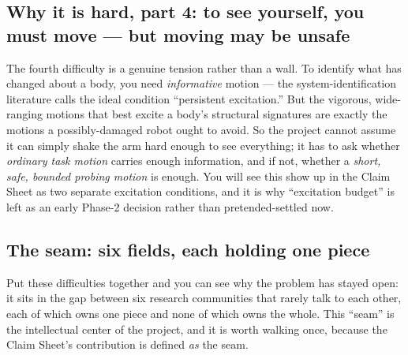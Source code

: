 \documentclass[12pt]{article}
\begin{document}
\subsection{Why it is hard, part 4: to see yourself, you must move --- but moving may be unsafe}

The fourth difficulty is a genuine tension rather than a wall. To identify what has changed about a body, you need \emph{informative} motion --- the system-identification literature calls the ideal condition ``persistent excitation.'' But the vigorous, wide-ranging motions that best excite a body's structural signatures are exactly the motions a possibly-damaged robot ought to avoid. So the project cannot assume it can simply shake the arm hard enough to see everything; it has to ask whether \emph{ordinary task motion} carries enough information, and if not, whether a \emph{short, safe, bounded probing motion} is enough. You will see this show up in the Claim Sheet as two separate excitation conditions, and it is why ``excitation budget'' is left as an early Phase-2 decision rather than pretended-settled now.

\subsection{The seam: six fields, each holding one piece}

Put these difficulties together and you can see why the problem has stayed open: it sits in the gap between six research communities that rarely talk to each other, each of which owns one piece and none of which owns the whole. This ``seam'' is the intellectual center of the project, and it is worth walking once, because the Claim Sheet's contribution is defined \emph{as} the seam.
\end{document}
